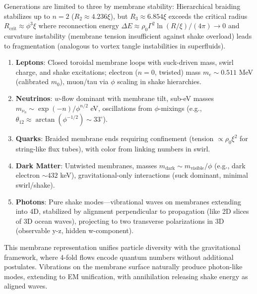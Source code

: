 Generations are limited to three by membrane stability: Hierarchical braiding stabilizes up to $n=2$ ($R_2 \approx 4.236 \xi$), but $R_3 \approx 6.854 \xi$ exceeds the critical radius $R_{\text{crit}} \approx \phi^3 \xi$ where reconnection energy $\Delta E \approx \rho_0 \Gamma^2 \ln(R / \xi) / (4\pi) \to 0$ and curvature instability (membrane tension insufficient against shake overload) leads to fragmentation (analogous to vortex tangle instabilities in superfluids).

\begin{enumerate}
\item \textbf{Leptons}: Closed toroidal membrane loops with suck-driven mass, swirl charge, and shake excitations; electron ($n=0$, twisted) mass $m_e \sim 0.511$ MeV (calibrated $m_0$), muon/tau via $\phi$ scaling in shake hierarchies.
\item \textbf{Neutrinos}: $w$-flow dominant with membrane tilt, sub-eV masses $m_{\nu_n} \sim \exp(-n) / \phi^{n/2}$ eV, oscillations from $\phi$-mixings (e.g., $\theta_{12} \approx \arctan(\phi^{-1/2}) \sim 33^\circ$).
\item \textbf{Quarks}: Braided membrane ends requiring confinement (tension $\propto \rho_0 \xi^2$ for string-like flux tubes), with color from linking numbers in swirl.
\item \textbf{Dark Matter}: Untwisted membranes, masses $m_{\text{dark}} \sim m_{\text{visible}} / \phi$ (e.g., dark electron $\sim 432$ keV), gravitational-only interactions (suck dominant, minimal swirl/shake).
\item \textbf{Photons}: Pure shake modes—vibrational waves on membranes extending into 4D, stabilized by alignment perpendicular to propagation (like 2D slices of 3D ocean waves), projecting to two transverse polarizations in 3D (observable y-z, hidden w-component).
\end{enumerate}

This membrane representation unifies particle diversity with the gravitational framework, where 4-fold flows encode quantum numbers without additional postulates. Vibrations on the membrane surface naturally produce photon-like modes, extending to EM unification, with annihilation releasing shake energy as aligned waves.

